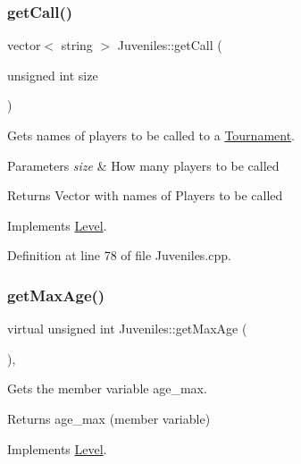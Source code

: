 \subsubsection{\texorpdfstring{get\+Call()}{getCall()}}
{\footnotesize\ttfamily vector$<$ string $>$ Juveniles\+::get\+Call (\begin{DoxyParamCaption}\item[{unsigned int}]{size }\end{DoxyParamCaption})\hspace{0.3cm}{\ttfamily [virtual]}}



Gets names of players to be called to a \hyperlink{class_tournament}{Tournament}. 


\begin{DoxyParams}{Parameters}
{\em size} & How many players to be called \\
\hline
\end{DoxyParams}
\begin{DoxyReturn}{Returns}
Vector with names of Players to be called 
\end{DoxyReturn}


Implements \hyperlink{class_level_ac118b390f16a75b9a0e9df198b3190ad}{Level}.



Definition at line 78 of file Juveniles.\+cpp.

\hypertarget{class_juveniles_a6b7825beb91d790fc5432902aedcc1fc}{}\label{class_juveniles_a6b7825beb91d790fc5432902aedcc1fc} 
\subsubsection{\texorpdfstring{get\+Max\+Age()}{getMaxAge()}}
{\footnotesize\ttfamily virtual unsigned int Juveniles\+::get\+Max\+Age (\begin{DoxyParamCaption}{ }\end{DoxyParamCaption})\hspace{0.3cm}{\ttfamily [inline]}, {\ttfamily [virtual]}}



Gets the member variable age\+\_\+max. 

\begin{DoxyReturn}{Returns}
age\+\_\+max (member variable) 
\end{DoxyReturn}


Implements \hyperlink{class_level_ae7b28ba0cb8d49372c4657fbe42706e1}{Level}.



